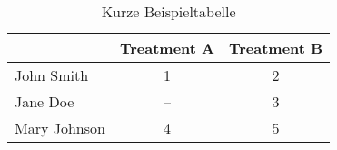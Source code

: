 \begin{table}[ht]
\centering
\caption{Kurze Beispieltabelle}
\label{tab:shortsample}
\begin{tabular}[t]{lcc}
\toprule
&Treatment A&Treatment B\\
\midrule
John Smith&1&2\\
Jane Doe&--&3\\
Mary Johnson&4&5\\
\bottomrule
\end{tabular}
\end{table}%